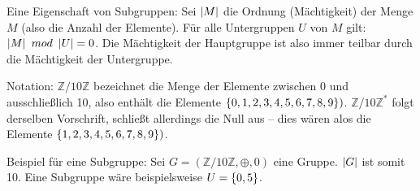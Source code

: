 Eine Eigenschaft von Subgruppen: Sei $\left\vert M\right\vert$ die Ordnung (Mächtigkeit) der Menge $M$ (also die Anzahl der Elemente). Für alle Untergruppen $U$ von $M$ gilt: $\left\vert M\right\vert\ mod\ \left\vert U\right\vert = 0$. Die Mächtigkeit der Hauptgruppe ist also immer teilbar durch die Mächtigkeit der Untergruppe.

Notation: $\mathbb{Z}/10\mathbb{Z}$ bezeichnet die Menge der Elemente zwischen 0 und ausschließlich 10, also enthält die Elemente $\set{0,1,2,3,4,5,6,7,8,9})$. $\mathbb{Z}/10\mathbb{Z}^*$ folgt derselben Vorschrift, schließt allerdings die Null aus -- dies wären alos die Elemente $\set{1,2,3,4,5,6,7,8,9})$.

Beispiel für eine Subgruppe: Sei $G = (\mathbb{Z}/10\mathbb{Z}, \oplus, 0)$ eine Gruppe. $\left\vert G\right\vert$ ist somit 10. Eine Subgruppe wäre beispielsweise $U = \set{0,5}$.
